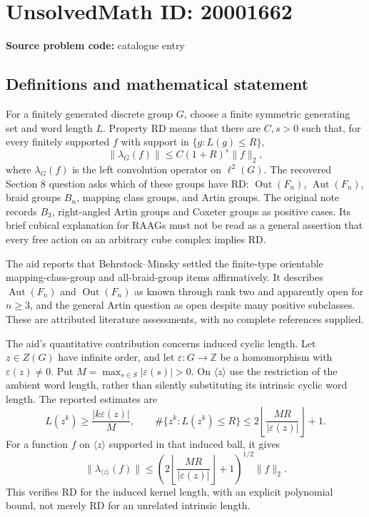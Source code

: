 \documentclass[11pt]{article}
\newcommand{\Z}{\mathbb{Z}}
\begin{document}
\section*{UnsolvedMath ID: 20001662}
\textbf{Source problem code:} catalogue entry
\subsection{Definitions and mathematical statement}
For a finitely generated discrete group \(G\), choose a finite symmetric generating set and word length \(L\). Property RD means that there are \(C,s>0\) such that, for every finitely supported \(f\) with support in \(\{g:L(g)\leq R\}\),
\[
 \|\lambda_G(f)\|\leq C(1+R)^s\|f\|_2,
\]
where \(\lambda_G(f)\) is the left convolution operator on \(\ell^2(G)\). The recovered Section 8 question asks which of these groups have RD: \(\operatorname{Out}(F_n)\), \(\operatorname{Aut}(F_n)\), braid groups \(B_n\), mapping class groups, and Artin groups. The original note records \(B_3\), right-angled Artin groups and Coxeter groups as positive cases. Its brief cubical explanation for RAAGs must not be read as a general assertion that every free action on an arbitrary cube complex implies RD.

The aid reports that Behrstock--Minsky settled the finite-type orientable mapping-class-group and all-braid-group items affirmatively. It describes \(\operatorname{Aut}(F_n)\) and \(\operatorname{Out}(F_n)\) as known through rank two and apparently open for \(n\geq3\), and the general Artin question as open despite many positive subclasses. These are attributed literature assessments, with no complete references supplied.

The aid's quantitative contribution concerns induced cyclic length. Let \(z\in Z(G)\) have infinite order, and let \(\varepsilon:G\to\Z\) be a homomorphism with \(\varepsilon(z)\ne0\). Put \(M=\max_{s\in S}|\varepsilon(s)|>0\). On \(\langle z\rangle\) use the restriction of the ambient word length, rather than silently substituting its intrinsic cyclic word length. The reported estimates are
\[
 L(z^k)\geq\frac{|k\varepsilon(z)|}{M},\qquad
 \#\{z^k:L(z^k)\leq R\}
 \leq2\left\lfloor\frac{MR}{|\varepsilon(z)|}\right\rfloor+1.
\]
For a function \(f\) on \(\langle z\rangle\) supported in that induced ball, it gives
\[
 \|\lambda_{\langle z\rangle}(f)\|
 \leq\left(2\left\lfloor\frac{MR}{|\varepsilon(z)|}\right\rfloor+1\right)^{1/2}\|f\|_2.
\]
This verifies RD for the induced kernel length, with an explicit polynomial bound, not merely RD for an unrelated intrinsic length.
\end{document}
